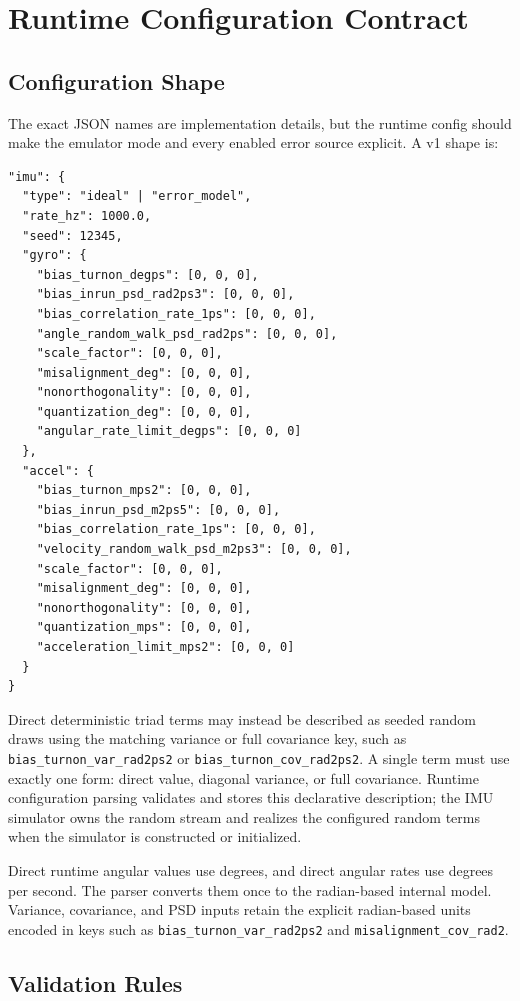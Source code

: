 \chapter{Runtime Configuration Contract}

\section{Configuration Shape}

The exact JSON names are implementation details, but the runtime config should
make the emulator mode and every enabled error source explicit. A v1 shape is:
\begin{verbatim}
"imu": {
  "type": "ideal" | "error_model",
  "rate_hz": 1000.0,
  "seed": 12345,
  "gyro": {
    "bias_turnon_degps": [0, 0, 0],
    "bias_inrun_psd_rad2ps3": [0, 0, 0],
    "bias_correlation_rate_1ps": [0, 0, 0],
    "angle_random_walk_psd_rad2ps": [0, 0, 0],
    "scale_factor": [0, 0, 0],
    "misalignment_deg": [0, 0, 0],
    "nonorthogonality": [0, 0, 0],
    "quantization_deg": [0, 0, 0],
    "angular_rate_limit_degps": [0, 0, 0]
  },
  "accel": {
    "bias_turnon_mps2": [0, 0, 0],
    "bias_inrun_psd_m2ps5": [0, 0, 0],
    "bias_correlation_rate_1ps": [0, 0, 0],
    "velocity_random_walk_psd_m2ps3": [0, 0, 0],
    "scale_factor": [0, 0, 0],
    "misalignment_deg": [0, 0, 0],
    "nonorthogonality": [0, 0, 0],
    "quantization_mps": [0, 0, 0],
    "acceleration_limit_mps2": [0, 0, 0]
  }
}
\end{verbatim}

Direct deterministic triad terms may instead be described as seeded random
draws using the matching variance or full covariance key, such as
\texttt{bias\_turnon\_var\_rad2ps2} or
\texttt{bias\_turnon\_cov\_rad2ps2}. A single term must use exactly one form:
direct value, diagonal variance, or full covariance. Runtime configuration
parsing validates and stores this declarative description; the IMU simulator
owns the random stream and realizes the configured random terms when the
simulator is constructed or initialized.

Direct runtime angular values use degrees, and direct angular rates use
degrees per second. The parser converts them once to the radian-based internal
model. Variance, covariance, and PSD inputs retain the explicit radian-based
units encoded in keys such as \texttt{bias\_turnon\_var\_rad2ps2} and
\texttt{misalignment\_cov\_rad2}.

\section{Validation Rules}

